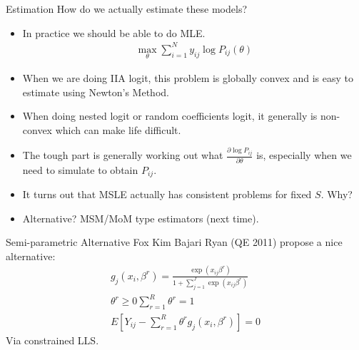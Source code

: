 \documentclass[xcolor=pdftex,dvipsnames,table,mathserif]{beamer}
\begin{document}
\begin{frame}{Estimation}
How do we actually estimate these models?
\begin{itemize}
\item In practice we should be able to do MLE.
\begin{eqnarray*}
\max_{\theta} \sum_{i=1}^N y_{ij} \log P_{ij}(\theta)
\end{eqnarray*}
\item When we are doing IIA logit, this problem is globally convex and is easy to estimate using Newton's Method.
\item When doing nested logit or random coefficients logit, it generally is non-convex which can make life difficult.
\item The tough part is generally working out what $\frac{\partial \log P_{ij}}{\partial \theta}$ is, especially when we need to simulate to obtain $P_{ij}$.
\item It turns out that MSLE actually has consistent problems for fixed $S$. Why?
\item Alternative? MSM/MoM type estimators (next time).
\end{itemize}
\end{frame}

\begin{frame}{Semi-parametric Alternative}
Fox Kim Bajari Ryan (QE 2011) propose a nice alternative:
\begin{eqnarray*}
g_j(x_i,\beta^r) = \frac{ \exp(x_{ij} \beta^r)}{1+ \sum_{j=1}^J \exp(x_{ij} \beta^r)}\\
\theta^r  \geq 0
\sum_{r=1}^R \theta^r =1\\
E[Y_{ij} - \sum_{r=1}^R \theta^r g_j(x_i,\beta^r)]=0
\end{eqnarray*}
Via constrained LLS.
\end{frame}
\end{document}
